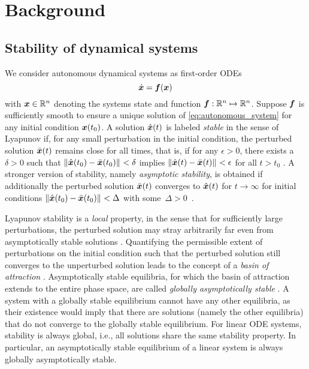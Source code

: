 \section{Background}\label{sec:background}

\subsection{Stability of dynamical systems}\label{sec:stability}

We consider autonomous dynamical systems as first-order ODEs
\begin{equation}\label{eq:autonomous_system}
    \dot{\boldsymbol{x}}=\boldsymbol{f}(\boldsymbol{x})
\end{equation}
with $\boldsymbol{x}\in{\mathbb{R}}^n$ denoting the systems state and function $\boldsymbol{f}:{\mathbb{R}}^n\mapsto{\mathbb{R}}^n$. Suppose $\boldsymbol{f}$ is sufficiently smooth to ensure a unique solution of \cref{eq:autonomous_system} for any initial condition $\boldsymbol{x}(t_0)$. A solution $\hat{\boldsymbol{x}}(t)$ is labeled \emph{stable} in the sense of Lyapunov if, for any small perturbation in the initial condition, the perturbed solution $\Bar{\boldsymbol{x}}(t)$ remains close for all times, that is, if for any $\epsilon>0$, there exists a $\delta>0$ such that $\left\lVert\hat{\boldsymbol{x}}(t_0) - \Bar{\boldsymbol{x}}(t_0)\right\rVert_{} < \delta$ implies  $\left\lVert\hat{\boldsymbol{x}}(t) - \Bar{\boldsymbol{x}}(t)\right\rVert_{} < \epsilon$ for all $t>t_0$ \cite{malkin1959, verhulst1990}.
A stronger version of stability, namely \emph{asymptotic stability}, is obtained if additionally the perturbed solution $\bar{\boldsymbol{x}}(t)$ converges to $\hat{\boldsymbol{x}}(t)$ for $t\rightarrow\infty$ for initial conditions $\left\lVert\hat{\boldsymbol{x}}(t_0) - \Bar{\boldsymbol{x}}(t_0)\right\rVert_{} < \Delta$ with some\, ${\Delta>0}$~\cite{verhulst1990}.

Lyapunov stability is a \emph{local} property, in the sense that for sufficiently large perturbations, the perturbed solution may stray arbitrarily far even from asymptotically stable solutions \cite{seydel2010}. 
Quantifying the permissible extent of perturbations on the initial condition such that the perturbed solution still converges to the unperturbed solution leads to the concept of a \emph{basin of attraction} \cite{layek2015}.
Asymptotically stable equilibria, for which the basin of attraction extends to the entire phase space, are called \emph{globally asymptotically stable} \cite{layek2015}. A system with a globally stable equilibrium cannot have any other equilibria, as their existence would imply that there are solutions (namely the other equilibria) that do not converge to the globally stable equilibrium.
For linear \gls{ODE} systems, stability is always global, i.e., all solutions share the same stability property. In particular, an asymptotically stable equilibrium of a linear system is always globally asymptotically stable.

